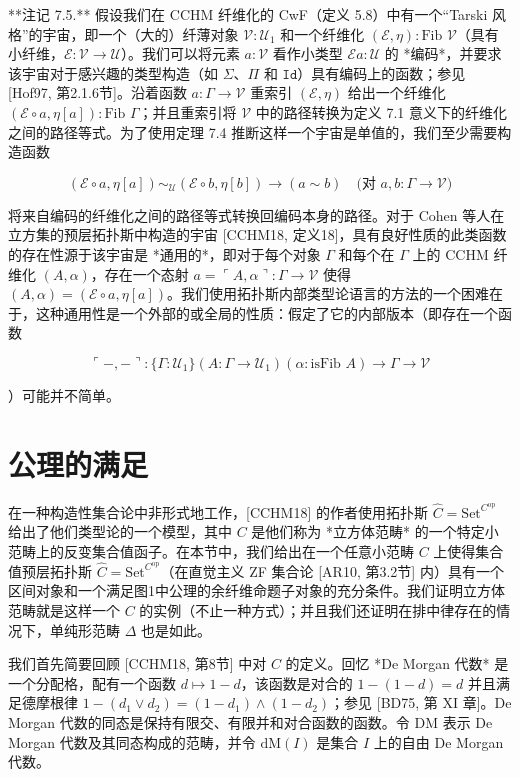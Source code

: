 \documentclass{ctexart}
\theoremstyle{plain}
\theoremstyle{definition}
\theoremstyle{definition}
\theoremstyle{definition}
\theoremstyle{definition}
\numberwithin{equation}{section}
\begin{document}
**注记 7.5.** 假设我们在 CCHM 纤维化的 CwF（定义 5.8）中有一个“Tarski 风格”的宇宙，即一个（大的）纤薄对象 $\mathcal{V} : \mathcal{U}_1$ 和一个纤维化 $(\mathcal{E}, \eta) : \text{Fib } \mathcal{V}$（具有小纤维，$\mathcal{E} : \mathcal{V} \to \mathcal{U}$）。我们可以将元素 $a : \mathcal{V}$ 看作小类型 $\mathcal{E} a : \mathcal{U}$ 的 *编码*，并要求该宇宙对于感兴趣的类型构造（如 $\Sigma$、$\Pi$ 和 $\mathtt{Id}$）具有编码上的函数；参见 [Hof97, 第2.1.6节]。沿着函数 $a : \Gamma \to \mathcal{V}$ 重索引 $(\mathcal{E}, \eta)$ 给出一个纤维化 $(\mathcal{E} \circ a, \eta[a]) : \text{Fib } \Gamma$；并且重索引将 $\mathcal{V}$ 中的路径转换为定义 7.1 意义下的纤维化之间的路径等式。为了使用定理 7.4 推断这样一个宇宙是单值的，我们至少需要构造函数

\[(\mathcal{E} \circ a, \eta[a]) \sim_{\mathcal{U}} (\mathcal{E} \circ b, \eta[b]) \to (a \sim b) \quad \text{(对 } a, b : \Gamma \to \mathcal{V})\]

将来自编码的纤维化之间的路径等式转换回编码本身的路径。对于 Cohen 等人在立方集的预层拓扑斯中构造的宇宙 [CCHM18, 定义18]，具有良好性质的此类函数的存在性源于该宇宙是 *通用的*，即对于每个对象 $\Gamma$ 和每个在 $\Gamma$ 上的 CCHM 纤维化 $(A, \alpha)$，存在一个态射 $a = \ulcorner A, \alpha \urcorner : \Gamma \to \mathcal{V}$ 使得 $(A, \alpha) = (\mathcal{E} \circ a, \eta[a])$。我们使用拓扑斯内部类型论语言的方法的一个困难在于，这种通用性是一个外部的或全局的性质：假定了它的内部版本（即存在一个函数

\[\ulcorner -, - \urcorner : \{ \Gamma : \mathcal{U}_1 \}(A : \Gamma \to \mathcal{U}_1)(\alpha : \text{isFib } A) \to \Gamma \to \mathcal{V}\]

）可能并不简单。

\section{公理的满足}

在一种构造性集合论中非形式地工作，[CCHM18] 的作者使用拓扑斯 \(\hat{C} = \text{Set}^{C^{\text{op}}}\) 给出了他们类型论的一个模型，其中 \(C\) 是他们称为 *立方体范畴* 的一个特定小范畴上的反变集合值函子。在本节中，我们给出在一个任意小范畴 \(C\) 上使得集合值预层拓扑斯 \(\hat{C} = \text{Set}^{C^{\text{op}}}\)（在直觉主义 ZF 集合论 [AR10, 第3.2节] 内）具有一个区间对象和一个满足图1中公理的余纤维命题子对象的充分条件。我们证明立方体范畴就是这样一个 \(C\) 的实例（不止一种方式）；并且我们还证明在排中律存在的情况下，单纯形范畴 \(\Delta\) 也是如此。

我们首先简要回顾 [CCHM18, 第8节] 中对 \(C\) 的定义。回忆 *De Morgan 代数* 是一个分配格，配有一个函数 \(d \mapsto 1 - d\)，该函数是对合的 \(1 - (1 - d) = d\) 并且满足德摩根律 \(1 - (d_1 \lor d_2) = (1 - d_1) \land (1 - d_2)\)；参见 [BD75, 第 XI 章]。De Morgan 代数的同态是保持有限交、有限并和对合函数的函数。令 \(\text{DM}\) 表示 De Morgan 代数及其同态构成的范畴，并令 \(\text{dM}(I)\) 是集合 \(I\) 上的自由 De Morgan 代数。
\end{document}
